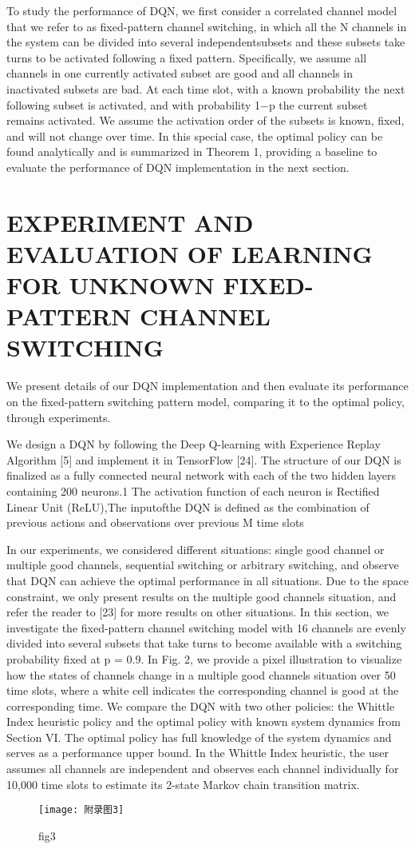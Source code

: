 To study the performance of DQN, we ﬁrst consider a correlated channel model that we refer to as ﬁxed-pattern channel switching, in which all the N channels in the system can be divided into several independentsubsets and these subsets take turns to be activated following a ﬁxed pattern. Speciﬁcally, we assume all channels in one currently activated subset are good and all channels in inactivated subsets are bad. At each time slot, with a known probability the next following subset is activated, and with probability 1−p the current subset remains activated. We assume the activation order of the subsets is known, ﬁxed, and will not change over time. In this special case, the optimal policy can be found analytically and is summarized in Theorem 1, providing a baseline to evaluate the performance of DQN implementation in the next section. 

\section{  EXPERIMENT AND EVALUATION OF LEARNING FOR UNKNOWN FIXED-PATTERN CHANNEL SWITCHING     }
We present details of our DQN implementation and then evaluate its performance on the ﬁxed-pattern switching pattern model, comparing it to the optimal policy, through experiments.

We design a DQN by following the Deep Q-learning with Experience Replay Algorithm [5] and implement it in TensorFlow [24]. The structure of our DQN is ﬁnalized as a fully connected neural network with each of the two hidden layers containing 200 neurons.1 The activation function of each neuron is Rectiﬁed Linear Unit (ReLU),The inputofthe DQN is deﬁned as the combination of previous actions and observations over previous M time slots

In our experiments, we considered different situations: single good channel or multiple good channels, sequential switching or arbitrary switching, and observe that DQN can achieve the optimal performance in all situations. Due to the space constraint, we only present results on the multiple good channels situation, and refer the reader to [23] for more results on other situations. In this section, we investigate the ﬁxed-pattern channel switching model with 16 channels are evenly divided into several subsets that take turns to become available with a switching probability ﬁxed at p = 0.9. In Fig. 2, we provide a pixel illustration to visualize how the states of channels change in a multiple good channels situation over 50 time slots, where a white cell indicates the corresponding channel is good at the corresponding time. We compare the DQN with two other policies: the Whittle Index heuristic policy and the optimal policy with known system dynamics from Section VI. The optimal policy has full knowledge of the system dynamics and serves as a performance upper bound. In the Whittle Index heuristic, the user assumes all channels are independent and observes each channel individually for 10,000 time slots to estimate its 2-state Markov chain transition matrix.
\begin{figure}[h]
	\centering
	\texttt{[image: 附录图3]}
	\caption{fig3}
\end{figure}

